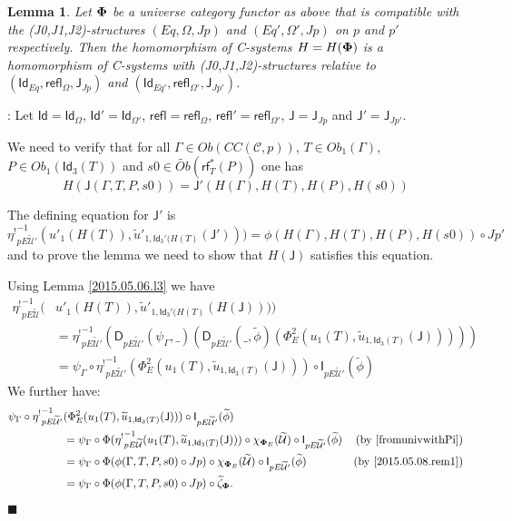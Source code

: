 \documentclass[12pt]{article}
\numberwithin{equation}{section}
\newenvironment{eq}{\begin{equation}}{\end{equation}}
\newenvironment{myproof}{{\bf Proof}:}{$\blacksquare$ \vskip 5mm }
\newtheorem{lemma}[proposition]{Lemma}
\newcommand{\by}[1]{\text{(by #1)}}
\newcommand{\wt}{\widetilde}
\newcommand{\toCC}{CC} %
\newcommand{\C}{{\mathcal C}}  %
\newcommand{\Id}{\mathsf{Id}} %
\newcommand{\Idx}{\mathsf{Id}_3} %
\newcommand{\refl}{\mathsf{refl}}
\newcommand{\J}{\mathsf{J}}
\newcommand{\U}{\mathcal{U}}
\newcommand{\D}{\mathsf{D}}
\newcommand{\I}{\mathsf{I}}
\newcommand{\rf}{\mathsf{rf}}
\newcommand{\etashriek}{\eta^!}
\newcommand{\etaunshriek}{{\etashriek}^{-1}}
\newcommand{\Obwt}{\wt{Ob}}
\begin{document}
\begin{lemma}
\label{2015.04.12.l3} Let ${\bf\Phi}$ be a universe category functor as above
that is compatible with the (J0,J1,J2)-structures $(Eq,\Omega,Jp)$ and
$(Eq',\Omega',Jp)$ on $p$ and $p'$ respectively. Then the homomorphism of
C-systems $H=H({\bf\Phi})$ is a homomorphism of C-systems with
(J0,J1,J2)-structures relative to $(\Id_{Eq},\refl_{\Omega},\J_{Jp})$ and
$(\Id_{Eq'},\refl_{\Omega'},\J_{Jp'})$.
\end{lemma}
%
\begin{myproof}
Let $\Id=\Id_{\Omega}$, $\Id'=\Id_{\Omega'}$, $\refl=\refl_{\Omega}$,
$\refl'=\refl_{\Omega'}$, $\J=\J_{Jp}$ and $\J'=\J_{Jp'}$.

We need to verify that for all $\Gamma\in Ob(\toCC({\C},p))$, $T\in
Ob_1(\Gamma)$, $P\in Ob_1(\Idx(T))$ and $s0\in \Obwt(\rf^*_T(P))$ one has
%
$$H(\J(\Gamma,T,P,s0))=\J'(H(\Gamma),H(T),H(P),H(s0))$$
%

The defining equation for $\J'$ is
%
\begin{eq}
  \label{def-eqn-J'}
  \etaunshriek_{pE\wt{\U}'}(u'_1(H(T)),\wt{u}'_{1,{\Idx'(H(T)}}(\J')))=\phi(H(\Gamma),H(T),H(P),H(s0)) \circ Jp' 
\end{eq}
and to prove the lemma we need to show that $H(\J)$ satisfies this equation.

Using Lemma \ref{2015.05.06.l3} we have
%
\begin{align*}
  \etaunshriek_{pE\wt{\U}}(&u'_1(H(T)),\wt{u}'_{1,{\Idx'(H(T)}}(H(\J)))) \\
    & = \etaunshriek_{pE\wt{\U}'}(\D_{pE\wt{\U}'}(\psi_{\Gamma},\_)(\D_{pE\wt{\U}'}(\_,\wt{\phi})(\Phi_E^2(u_1(T),\wt{u}_{1,\Idx(T)}(\J))))) \\
    & = \psi_{\Gamma}\circ \etaunshriek_{pE\wt{\U}'}(\Phi_E^2(u_1(T),\wt{u}_{1,\Idx(T)}(\J)))\circ \I_{pE\wt{\U}'}(\wt{\phi})
\end{align*}
%
We further have:
%
\begin{align*}
  \psi_{\Gamma}\circ \etaunshriek_{pE\wt{\U}'}&(\Phi_E^2(u_1(T),\wt{u}_{1,\Idx(T)}(\J)))\circ \I_{pE\wt{\U}'}(\wt{\phi}) \\
    & = \psi_{\Gamma}\circ \Phi(\etaunshriek_{pE\wt{\U}}(u_1(T),\wt{u}_{1,\Idx(T)}(\J)))\circ \chi_{{\bf\Phi}_E}(\wt{\U})\circ \I_{pE\wt{\U}'}(\wt{\phi}) & \by{\cite[Lemma 5.8]{fromunivwithPi}} \\
    & = \psi_{\Gamma}\circ \Phi(\phi(\Gamma,T,P,s0)\circ Jp)\circ \chi_{{\bf\Phi}_E}(\wt{\U})\circ \I_{pE\wt{\U}'}(\wt{\phi}) & \by{\ref{2015.05.08.rem1}} \\
    & = \psi_{\Gamma}\circ \Phi(\phi(\Gamma,T,P,s0)\circ Jp)\circ \wt{\zeta}_{\bf\Phi}.
\end{align*}
%


\end{myproof}
\end{document}
